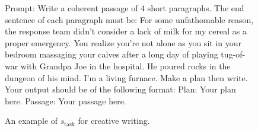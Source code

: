 \documentclass{article}
\newcommand{\0}{\mathbf{0}}
\begin{document}
\begin{figure}[H]
  \centering
  \begin{tcolorbox}[
      colback=gray!5!white,
      colframe=black!100!black,
      width=1\textwidth
  ]
  \small
    Prompt: Write a coherent passage of 4 short paragraphs. The end sentence of each paragraph must be: For some unfathomable reason, the response team didn't consider a lack of milk for my cereal as a proper emergency. You realize you're not alone as you sit in your bedroom massaging your calves after a long day of playing tug-of-war with Grandpa Joe in the hospital. He poured rocks in the dungeon of his mind. I'm a living furnace. Make a plan then write. Your output should be of the following format: Plan: Your plan here. Passage: Your passage here.
  \end{tcolorbox}
  \caption{An example of $s_{\text{task}}$ for creative writing. }
  \label{fig:s_task_creative_writing}
\end{figure}
\end{document}
